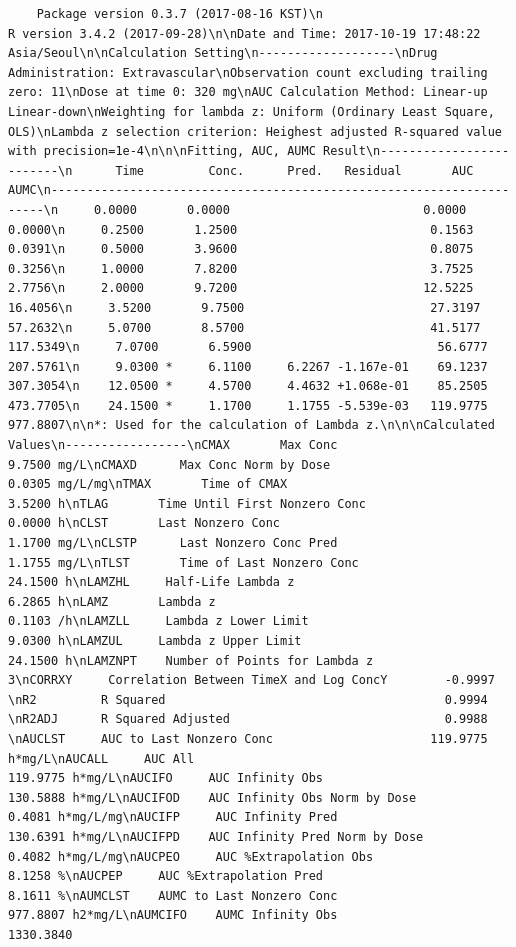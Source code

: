 \documentclass[]{krantz}
\theoremstyle{definition}
\theoremstyle{definition}
\theoremstyle{definition}
\theoremstyle{remark}
\begin{document}
\begin{verbatim}
    Package version 0.3.7 (2017-08-16 KST)\n                          R version 3.4.2 (2017-09-28)\n\nDate and Time: 2017-10-19 17:48:22 Asia/Seoul\n\nCalculation Setting\n-------------------\nDrug Administration: Extravascular\nObservation count excluding trailing zero: 11\nDose at time 0: 320 mg\nAUC Calculation Method: Linear-up Linear-down\nWeighting for lambda z: Uniform (Ordinary Least Square, OLS)\nLambda z selection criterion: Heighest adjusted R-squared value with precision=1e-4\n\n\nFitting, AUC, AUMC Result\n-------------------------\n      Time         Conc.      Pred.   Residual       AUC       AUMC\n---------------------------------------------------------------------\n     0.0000       0.0000                           0.0000     0.0000\n     0.2500       1.2500                           0.1563     0.0391\n     0.5000       3.9600                           0.8075     0.3256\n     1.0000       7.8200                           3.7525     2.7756\n     2.0000       9.7200                          12.5225    16.4056\n     3.5200       9.7500                          27.3197    57.2632\n     5.0700       8.5700                          41.5177   117.5349\n     7.0700       6.5900                          56.6777   207.5761\n     9.0300 *     6.1100     6.2267 -1.167e-01    69.1237   307.3054\n    12.0500 *     4.5700     4.4632 +1.068e-01    85.2505   473.7705\n    24.1500 *     1.1700     1.1755 -5.539e-03   119.9775   977.8807\n\n*: Used for the calculation of Lambda z.\n\n\nCalculated Values\n-----------------\nCMAX       Max Conc                                        9.7500 mg/L\nCMAXD      Max Conc Norm by Dose                           0.0305 mg/L/mg\nTMAX       Time of CMAX                                    3.5200 h\nTLAG       Time Until First Nonzero Conc                   0.0000 h\nCLST       Last Nonzero Conc                               1.1700 mg/L\nCLSTP      Last Nonzero Conc Pred                          1.1755 mg/L\nTLST       Time of Last Nonzero Conc                      24.1500 h\nLAMZHL     Half-Life Lambda z                              6.2865 h\nLAMZ       Lambda z                                        0.1103 /h\nLAMZLL     Lambda z Lower Limit                            9.0300 h\nLAMZUL     Lambda z Upper Limit                           24.1500 h\nLAMZNPT    Number of Points for Lambda z                   3\nCORRXY     Correlation Between TimeX and Log ConcY        -0.9997 \nR2         R Squared                                       0.9994 \nR2ADJ      R Squared Adjusted                              0.9988 \nAUCLST     AUC to Last Nonzero Conc                      119.9775 h*mg/L\nAUCALL     AUC All                                       119.9775 h*mg/L\nAUCIFO     AUC Infinity Obs                              130.5888 h*mg/L\nAUCIFOD    AUC Infinity Obs Norm by Dose                   0.4081 h*mg/L/mg\nAUCIFP     AUC Infinity Pred                             130.6391 h*mg/L\nAUCIFPD    AUC Infinity Pred Norm by Dose                  0.4082 h*mg/L/mg\nAUCPEO     AUC %Extrapolation Obs                          8.1258 %\nAUCPEP     AUC %Extrapolation Pred                         8.1611 %\nAUMCLST    AUMC to Last Nonzero Conc                     977.8807 h2*mg/L\nAUMCIFO    AUMC Infinity Obs                            1330.3840 
\end{verbatim}
\end{document}
